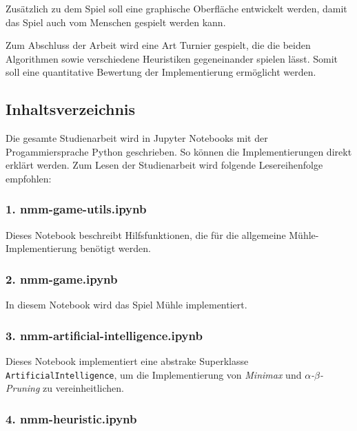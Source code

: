 \documentclass[11pt]{article}
\begin{document}
Zusätzlich zu dem Spiel soll eine graphische Oberfläche entwickelt
werden, damit das Spiel auch vom Menschen gespielt werden kann.

Zum Abschluss der Arbeit wird eine Art Turnier gespielt, die die beiden
Algorithmen sowie verschiedene Heuristiken gegeneinander spielen lässt.
Somit soll eine quantitative Bewertung der Implementierung ermöglicht
werden.

    \hypertarget{inhaltsverzeichnis}{%
\subsection{Inhaltsverzeichnis}\label{inhaltsverzeichnis}}

Die gesamte Studienarbeit wird in Jupyter Notebooks mit der
Progammiersprache Python geschrieben. So können die Implementierungen
direkt erklärt werden. Zum Lesen der Studienarbeit wird folgende
Lesereihenfolge empfohlen:

\hypertarget{nmm-game-utils.ipynb}{%
\subsubsection{1. nmm-game-utils.ipynb}\label{nmm-game-utils.ipynb}}

Dieses Notebook beschreibt Hilfsfunktionen, die für die allgemeine
Mühle-Implementierung benötigt werden.

\hypertarget{nmm-game.ipynb}{%
\subsubsection{2. nmm-game.ipynb}\label{nmm-game.ipynb}}

In diesem Notebook wird das Spiel Mühle implementiert.

\hypertarget{nmm-artificial-intelligence.ipynb}{%
\subsubsection{3.
nmm-artificial-intelligence.ipynb}\label{nmm-artificial-intelligence.ipynb}}

Dieses Notebook implementiert eine abstrake Superklasse
\texttt{ArtificialIntelligence}, um die Implementierung von
\emph{Minimax} und \emph{$\alpha$-$\beta$-Pruning} zu vereinheitlichen.

\hypertarget{nmm-heuristic.ipynb}{%
\subsubsection{4. nmm-heuristic.ipynb}\label{nmm-heuristic.ipynb}}
\end{document}
